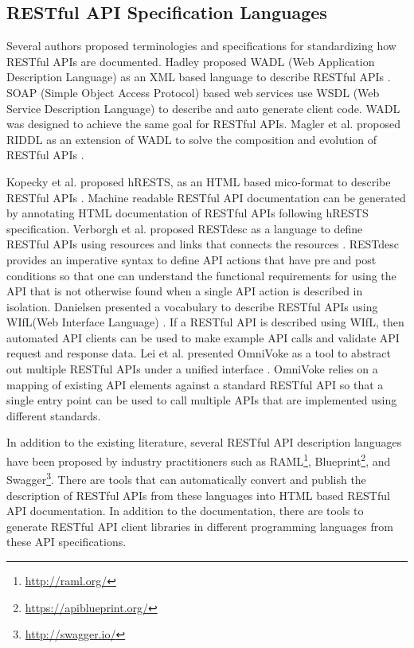 \documentclass[11pt,oneside]{book}
\begin{document}
\subsection{RESTful API Specification Languages} %
\label{sub:restful_api_specification_languages}

Several authors proposed terminologies and specifications for standardizing how RESTful APIs are documented. Hadley proposed WADL (Web Application Description Language) as an XML based language to describe RESTful APIs \cite{hadley2006web}. SOAP (Simple Object Access Protocol) based web services use WSDL (Web Service Description Language) to describe and auto generate client code. WADL was designed to achieve the same goal for RESTful APIs. Magler et al. proposed RIDDL as an extension of WADL to solve the composition and evolution of RESTful APIs \cite{mangler2010origin}.

Kopecky et al. proposed hRESTS, as an HTML based mico-format to describe RESTful APIs \cite{Kopecky_hrests}. Machine readable RESTful API documentation can be generated by annotating HTML documentation of RESTful APIs following hRESTS specification. Verborgh et al. proposed RESTdesc as a language to define RESTful APIs using resources and links that connects the resources \cite{RESTdesc}. RESTdesc provides an imperative syntax to define API actions that have pre and post conditions so that one can understand the functional requirements for using the API that is not otherwise found when a single API action is described in isolation. Danielsen presented a vocabulary to describe RESTful APIs using WIfL(Web Interface Language) \cite{Danielsen_validation}. If a RESTful API is described using WIfL, then automated API clients can be used to make  example API calls and validate API request and response data. Lei et al. presented OmniVoke as a tool to abstract out multiple RESTful APIs under a unified interface \cite{Ning_omnivoke}. OmniVoke relies on a mapping of existing API elements against a standard RESTful API so that a single entry point can be used to call multiple APIs that are implemented using different standards.

In addition to the existing literature, several RESTful API description languages have been proposed by industry practitioners such as RAML\footnote{\url{http://raml.org/}}, Blueprint\footnote{\url{https://apiblueprint.org/}}, and Swagger\footnote{\url{http://swagger.io/}}. There are tools that can automatically convert and publish the description of RESTful APIs from these languages into HTML based RESTful API documentation. In addition to the documentation, there are tools to generate RESTful API client libraries in different programming languages from these API specifications.
\end{document}
